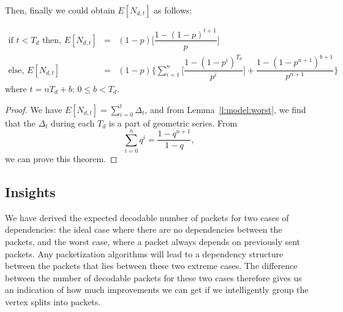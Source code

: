     Then, finally we could obtain $E[N_{d,t}]$ as
    follows:
    \begin{theorem}
    \label{t:model:worst}
    \begin{eqnarray*}
       \textrm{if $t<T_d$ then, } E[N_{d,t}] &=& (1-p)\Big[\dfrac{1-(1-p)^{t+1}}{p}\Big]\\ 
       \textrm{else, } E[N_{d,t}] &=& (1-p)\Big\{\sum_{i=1}^n\Big[\dfrac{1-(1-p^i)^{T_d}}{p^i}\Big] +
       \dfrac{1-(1-p^{n+1})^{b+1}}{p^{n+1}}\Big\}
    \end{eqnarray*}
    where $t=nT_d+b$; $0 \le b<T_d$.
    \end{theorem}
    \begin{proof}
    We have $E[N_{d,t}] = \sum_{i=0}^{t}\Delta_t$, and from Lemma~\ref{l:model:worst}, we
    find that the $\Delta_t$ during each $T_d$ is a part of geometric series. From
    \begin{displaymath}
        \sum_{i=0}^nq^i = \dfrac{1-q^{n+1}}{1-q}, 
    \end{displaymath}
    we can prove this theorem.
    \QED
    \end{proof}

\subsection{Insights}
    We have derived the expected decodable number of packets for
    two cases of dependencies: the ideal case where there are no
    dependencies between the packets, and the worst case, where
    a packet always depends on previously sent packets.  Any
    packetization algorithms will lead to a
    dependency structure between the packets that lies between
    these two extreme cases.  The difference between the number of
    decodable packets for these two cases therefore gives us an
    indication of how much improvements we can get if we intelligently
    group the vertex splits into packets.  
    
